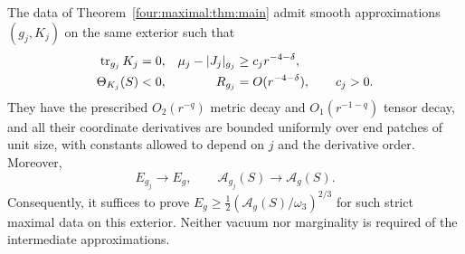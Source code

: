\begin{proposition}
\label{four:maximal:prop:strict-data}
The data of Theorem~\ref{four:maximal:thm:main} admit smooth approximations
\((g_j,K_j)\) on the same exterior such that
\begin{equation}
\begin{aligned}
 \operatorname{tr}_{g_j}K_j&=0,&
 \mu_j-|J_j|_{g_j}&\ge c_j r^{-4-\delta},\\
 \Theta_{K_j}(S)&<0,&
 R_{g_j}&=O(r^{-4-\delta}),
 \qquad c_j>0.
\end{aligned}
\label{four:maximal:prep:strict-properties}
\end{equation}
They have the prescribed \(O_2(r^{-q})\) metric decay and
\(O_1(r^{-1-q})\) tensor decay, and all their coordinate derivatives
are bounded uniformly over end patches of unit size, with constants
allowed to depend on \(j\) and the derivative order.  Moreover,
\begin{equation}
 E_{g_j}\longrightarrow E_g,
 \qquad \mathcal A_{g_j}(S)\longrightarrow\mathcal A_g(S).
\label{four:maximal:prep:approx-limits}
\end{equation}
Consequently, it suffices to prove
\(E_g\ge\tfrac12(\mathcal A_g(S)/\omega_3)^{2/3}\) for such strict maximal
data on this exterior.  Neither vacuum nor marginality is required of
the intermediate approximations.
\end{proposition}

